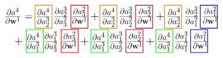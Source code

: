 \message{ !name(main.tex)}\documentclass[11pt]{article}
\begin{document}
\begin{equation}\label{eq:chain_rule}
  \begin{tikzpicture}[baseline=(current bounding box.center),thick,scale=0.8, every node/.style={scale=0.8}]
    \node (A) at (0,1.3) {
      \LARGE{$
          \frac{\partial a^{4}}{\partial \mathbf{w}^{1}} =  
          \frac{\partial a^{4}}{\partial a_{2}^{3}}\; \frac{\partial a_{2}^{3}}{\partial a_{3}^{2}}\;\frac{\partial a_{3}^{2}}{\partial \mathbf{w}^{1}} 
          + \frac{\partial a^{4}}{\partial a_{2}^{3}}\; \frac{\partial a_{2}^{3}}{\partial a_{2}^{2}}\;\frac{\partial a_{2}^{2}}{\partial \mathbf{w}^{1}} 
          + \frac{\partial a^{4}}{\partial a_{2}^{3}}\; \frac{\partial a_{2}^{3}}{\partial a_{1}^{2}}\;\frac{\partial a_{1}^{2}}{\partial \mathbf{w}^{1}}
        $}
    };

    \node (B) at (0,0) {
      \LARGE{$
          +\; \frac{\partial a^{4}}{\partial a_{1}^{3}} \;\frac{\partial a_{1}^{3}}{\partial a_{3}^{2}}\;\frac{\partial a_{3}^{2}}{\partial \mathbf{w}^{1}} 
          + \frac{\partial a^{4}}{\partial a_{1}^{3}} \;\frac{\partial a_{1}^{3}}{\partial a_{2}^{2}}\;\frac{\partial a_{2}^{2}}{\partial \mathbf{w}^{1}} 
          + \frac{\partial a^{4}}{\partial a_{1}^{3}} \;\frac{\partial a_{1}^{3}}{\partial a_{1}^{2}}\;\frac{\partial a_{1}^{2}}{\partial \mathbf{w}^{1}}
        $}
    };

    \foreach \Rnumber in {0,...,2} {
      \draw[thick,orange] (\tbdis*\Rnumber + \xbase,\ybase) -- (\tbdis*\Rnumber + \xbase,\ybase + \hibox) -- (\tbdis*\Rnumber + \xbase + \wibox,\ybase + \hibox) -- (\tbdis*\Rnumber + \xbase + \wibox,\ybase) -- (\tbdis*\Rnumber + \xbase,\ybase);
    }

    \foreach \Rnumber in {0,...,2} {
      \draw[thick,green] (\bbdis*\Rnumber + \xbase + \xbshift,\ybase+\ybshift) -- (\bbdis*\Rnumber + \xbase + \xbshift,\ybase+\ybshift + \hibox) -- (\bbdis*\Rnumber + \xbase + \xbshift + \wibox,\ybase+\ybshift + \hibox) -- (\bbdis*\Rnumber + \xbase + \xbshift + \wibox,\ybase+\ybshift) -- (\bbdis*\Rnumber + \xbase + \xbshift,\ybase+\ybshift);
    }

    \foreach \Rnumber/\c in {0/red,1/purple,2/blue} {%
      \draw[thick,\c] (\tbdis*\Rnumber + \xbase + \xotshift,\ybase) -- (\tbdis*\Rnumber + \xbase + \xotshift,\ybase + \hibox) -- (\tbdis*\Rnumber + \xbase + \xotshift + \wibox,\ybase + \hibox) -- (\tbdis*\Rnumber + \xbase + \xotshift + \wibox,\ybase) -- (\tbdis*\Rnumber + \xbase + \xotshift,\ybase);
    }

    \foreach \Rnumber/\c in {0/red,1/purple,2/blue} {%
      \draw[thick,\c] (\bbdis*\Rnumber + \xbase + \xobshift,\ybase+\ybshift) -- (\bbdis*\Rnumber + \xbase + \xobshift,\ybase+\ybshift + \hibox) -- (\bbdis*\Rnumber + \xbase + \xobshift + \wibox,\ybase+\ybshift + \hibox) -- (\bbdis*\Rnumber + \xbase + \xobshift + \wibox,\ybase+\ybshift) -- (\bbdis*\Rnumber + \xbase + \xobshift,\ybase+\ybshift);
    }
  \end{tikzpicture}
\end{equation}
\end{document}
